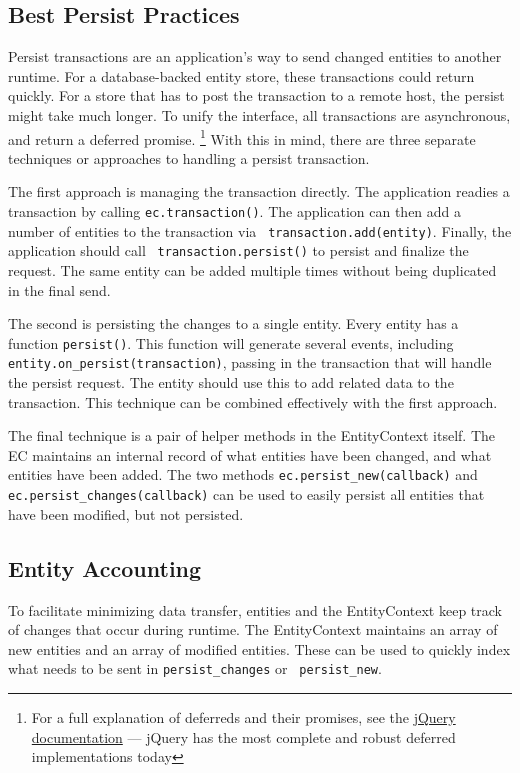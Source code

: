 \documentclass{article}
\newcommand{\ilcode}{\tt}
\begin{document}
\subsection{Best Persist Practices}

Persist transactions are an application's way to send changed entities to
another runtime. For a database-backed entity store, these transactions could
return quickly. For a store that has to post the transaction to a remote host,
the persist might take much longer. To unify the interface, all transactions are
asynchronous, and return a deferred promise.
\footnote{For a full explanation of deferreds and their promises, see the
\href{http://api.jquery.com/category/deferred-object}{jQuery documentation}
--- jQuery has the most complete and robust deferred implementations today}
With this in mind, there are three separate techniques or approaches to handling
a persist transaction.

The first approach is managing the transaction directly. The application readies
a transaction by calling {\ilcode ec.transaction()}. The application can then
add a number of entities to the transaction via {\ilcode
transaction.add(entity)}. Finally, the application should call {\ilcode
transaction.persist()} to persist and finalize the request. The same entity can
be added multiple times without being duplicated in the final send.

The second is persisting the changes to a single entity. Every entity has a
function {\ilcode persist()}. This function will generate several events,
including {\ilcode entity.on\_persist(transaction)}, passing in the transaction
that will handle the persist request. The entity should use this to add related
data to the transaction. This technique can be combined effectively with the
first approach.

The final technique is a pair of helper methods in the EntityContext itself. The
EC maintains an internal record of what entities have been changed, and what
entities have been added. The two methods {\ilcode ec.persist\_new(callback)}
and {\ilcode ec.persist\_changes(callback)} can be used to easily persist all
entities that have been modified, but not persisted.

\subsection{Entity Accounting}

To facilitate minimizing data transfer, entities and the EntityContext keep
track of changes that occur during runtime. The EntityContext maintains an array
of new entities and an array of modified entities. These can be used to quickly
index what needs to be sent in {\ilcode persist\_changes} or {\ilcode
persist\_new}.
\end{document}
